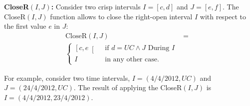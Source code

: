 \begin{definition}
\textbf{CloseR$\left( I, J \right)$:}
\label{def:close-a-crisp-interval-r}
Consider two crisp intervals $I= \left[c ,d \right]$ and $J= \left[e ,f \right]$. The CloseR$\left(I, J\right)$ function allows to close the right-open interval $I$ with respect to the first value $e$ in $J$:
\begin{align}
\label{eq:close-a-crisp-interval}
\mbox{CloseR} \left( I, J \right) &=& \\ 
\begin{cases}
\nonumber
\left[c, e \right[ & \mbox{ if } d = UC \wedge J \mbox{ During } I \\
I & \mbox{ in any other case.}
\end{cases}
\end{align}
\end{definition}

For example, consider two time intervals, $I = \left(4/4/2012, UC \right)$ and $J = \left(24/4/2012, UC \right)$. The result of applying the CloseR$\left(I, J \right)$ is $I = \left(4/4/2012, 23/4/2012 \right)$.








%




